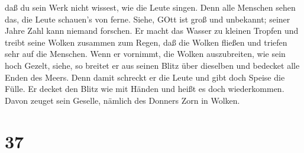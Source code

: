 daß du sein Werk nicht wissest, wie die Leute singen.  Denn
alle Menschen sehen das, die Leute schauen's von ferne. 
Siehe, GOtt ist groß und unbekannt; seiner Jahre Zahl kann niemand
forschen.  Er macht das Wasser zu kleinen Tropfen und
treibt seine Wolken zusammen zum Regen,  daß die Wolken
fließen und triefen sehr auf die Menschen.  Wenn er
vornimmt, die Wolken auszubreiten, wie sein hoch Gezelt, 
siehe, so breitet er aus seinen Blitz über dieselben und bedecket alle
Enden des Meers.  Denn damit schreckt er die Leute und gibt
doch Speise die Fülle.  Er decket den Blitz wie mit Händen
und heißt es doch wiederkommen.  Davon zeuget sein Geselle,
nämlich des Donners Zorn in Wolken.

\hypertarget{section-36}{%
\section{37}\label{section-36}}

